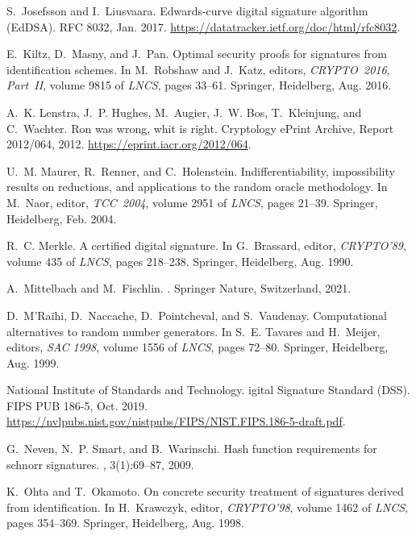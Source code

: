 \begin{thebibliography}{10}
S.~Josefsson and I.~Liusvaara.
\newblock Edwards-curve digital signature algorithm ({EdDSA}).
\newblock RFC 8032, Jan. 2017.
\newblock \url{https://datatracker.ietf.org/doc/html/rfc8032}.

E.~Kiltz, D.~Masny, and J.~Pan.
\newblock Optimal security proofs for signatures from identification schemes.
\newblock In M.~Robshaw and J.~Katz, editors, {\em CRYPTO~2016, Part~II},
  volume 9815 of {\em {LNCS}}, pages 33--61. Springer, Heidelberg, Aug. 2016.

A.~K. Lenstra, J.~P. Hughes, M.~Augier, J.~W. Bos, T.~Kleinjung, and
  C.~Wachter.
\newblock Ron was wrong, whit is right.
\newblock Cryptology ePrint Archive, Report 2012/064, 2012.
\newblock \url{https://eprint.iacr.org/2012/064}.

U.~M. Maurer, R.~Renner, and C.~Holenstein.
\newblock Indifferentiability, impossibility results on reductions, and
  applications to the random oracle methodology.
\newblock In M.~Naor, editor, {\em TCC~2004}, volume 2951 of {\em {LNCS}},
  pages 21--39. Springer, Heidelberg, Feb. 2004.

R.~C. Merkle.
\newblock A certified digital signature.
\newblock In G.~Brassard, editor, {\em CRYPTO'89}, volume 435 of {\em {LNCS}},
  pages 218--238. Springer, Heidelberg, Aug. 1990.

A.~Mittelbach and M.~Fischlin.
.
\newblock Springer Nature, Switzerland, 2021.

D.~M'Ra{\"i}hi, D.~Naccache, D.~Pointcheval, and S.~Vaudenay.
\newblock Computational alternatives to random number generators.
\newblock In S.~E. Tavares and H.~Meijer, editors, {\em SAC 1998}, volume 1556
  of {\em {LNCS}}, pages 72--80. Springer, Heidelberg, Aug. 1999.

{National Institute of Standards and Technology}.
igital {S}ignature {S}tandard ({DSS}).
\newblock FIPS PUB 186-5, Oct. 2019.
\newblock
  \url{https://nvlpubs.nist.gov/nistpubs/FIPS/NIST.FIPS.186-5-draft.pdf}.

G.~Neven, N.~P. Smart, and B.~Warinschi.
\newblock Hash function requirements for schnorr signatures.
, 3(1):69--87, 2009.

K.~Ohta and T.~Okamoto.
\newblock On concrete security treatment of signatures derived from
  identification.
\newblock In H.~Krawczyk, editor, {\em CRYPTO'98}, volume 1462 of {\em {LNCS}},
  pages 354--369. Springer, Heidelberg, Aug. 1998.


\end{thebibliography}
